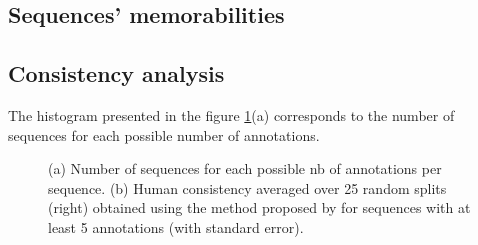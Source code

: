 \documentclass[sigconf]{acmart}
\begin{document}
\subsection{Sequences' memorabilities}





\subsection{Consistency analysis}
The histogram presented in the figure \ref{fig:human_consistency}(a) corresponds to the number of sequences for each possible number of annotations.

\begin{figure}[!htbp]
	\centering
	\quad
	\caption{\label{fig:human_consistency}(a) Number of sequences for each possible nb of annotations per sequence. (b) Human consistency averaged over 25 random splits (right) obtained using the method proposed by \cite{isola_2014_makes} for sequences with at least 5 annotations (with standard error).}
\end{figure}
\end{document}
